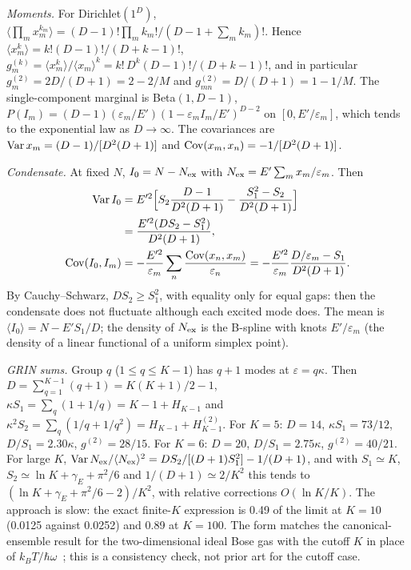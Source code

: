 \documentclass[aps,pra,twocolumn,superscriptaddress,nofootinbib,floatfix]{revtex4-2}
\begin{document}
\textit{Moments.} For Dirichlet$(1^D)$,
$\langle\prod_mx_m^{k_m}\rangle=(D-1)!\prod_mk_m!/(D-1+\sum_mk_m)!$. Hence $\langle x_m^k\rangle=k!(D-1)!/(D+k-1)!$,
$g^{(k)}_m=\langle x_m^k\rangle/\langle x_m\rangle^k=k!\,D^k(D-1)!/(D+k-1)!$, and in particular $g^{(2)}_m=2D/(D+1)=2-2/M$
and $g^{(2)}_{mn}=D/(D+1)=1-1/M$. The single-component marginal is Beta$(1,D-1)$,
$P(I_m)=(D-1)(\varepsilon_m/E')(1-\varepsilon_mI_m/E')^{D-2}$ on $[0,E'/\varepsilon_m]$, which tends to the exponential law as
$D\to\infty$. The covariances are ${\rm Var}\,x_m=(D-1)/[D^2(D+1)]$ and ${\rm Cov}(x_m,x_n)=-1/[D^2(D+1)]$.

\textit{Condensate.} At fixed $N$, $I_0=N-N_{\rm ex}$ with $N_{\rm ex}=E'\sum_mx_m/\varepsilon_m$. Then
\begin{align}
{\rm Var}\,I_0&=E'^2\Big[S_2\frac{D-1}{D^2(D+1)}-\frac{S_1^2-S_2}{D^2(D+1)}\Big]\nonumber\\
&=\frac{E'^2(DS_2-S_1^2)}{D^2(D+1)},\\
{\rm Cov}(I_0,I_m)&=-\frac{E'^2}{\varepsilon_m}\sum_n\frac{{\rm Cov}(x_n,x_m)}{\varepsilon_n}
=-\frac{E'^2}{\varepsilon_m}\frac{D/\varepsilon_m-S_1}{D^2(D+1)} .
\end{align}
By Cauchy--Schwarz, $DS_2\ge S_1^2$, with equality only for equal gaps: then the condensate does not fluctuate although
each excited mode does. The mean is $\langle I_0\rangle=N-E'S_1/D$; the density of $N_{\rm ex}$ is the B-spline with knots
$E'/\varepsilon_m$ (the density of a linear functional of a uniform simplex point).

\textit{GRIN sums.} Group $q$ ($1\le q\le K-1$) has $q+1$ modes at $\varepsilon=q\kappa$. Then
$D=\sum_{q=1}^{K-1}(q+1)=K(K+1)/2-1$, $\kappa S_1=\sum_q(1+1/q)=K-1+H_{K-1}$ and $\kappa^2S_2=\sum_q(1/q+1/q^2)=H_{K-1}+H^{(2)}_{K-1}$.
For $K=5$: $D=14$, $\kappa S_1=73/12$, $D/S_1=2.30\kappa$, $g^{(2)}=28/15$. For $K=6$: $D=20$, $D/S_1=2.75\kappa$,
$g^{(2)}=40/21$. For large $K$, ${\rm Var}\,N_{\rm ex}/\langle N_{\rm ex}\rangle^2=DS_2/[(D+1)S_1^2]-1/(D+1)$, and with
$S_1\simeq K$, $S_2\simeq\ln K+\gamma_E+\pi^2/6$ and $1/(D+1)\simeq2/K^2$ this tends to
$(\ln K+\gamma_E+\pi^2/6-2)/K^2$, with relative corrections $O(\ln K/K)$. The approach is slow: the exact finite-$K$
expression is 0.49 of the limit at $K=10$ (0.0125 against 0.0252) and 0.89 at $K=100$. The form matches the canonical-ensemble result
for the two-dimensional ideal Bose gas with the cutoff $K$ in place of $k_BT/\hbar\omega$~\cite{holthaus1998}; this is a
consistency check, not prior art for the cutoff case.
\end{document}
